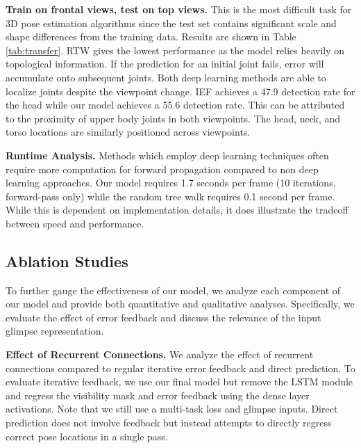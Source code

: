 \documentclass[runningheads]{llncs}
\begin{document}
	\textbf{Train on frontal views, test on top views.} This is the most difficult task for 3D pose estimation algorithms since the test set contains significant scale and shape differences from the training data. Results are shown in Table \ref{tab:transfer}. RTW gives the lowest performance as the model relies heavily on topological information.
	If the prediction for an initial joint fails, error will accumulate onto subsequent joints.
	Both deep learning methods are able to localize joints despite the viewpoint change.
	IEF achieves a 47.9 detection rate for the head while our model achieves a 55.6 detection rate.
	This can be attributed to the proximity of upper body joints in both viewpoints. The head, neck, and torso locations are similarly positioned across viewpoints.

	\textbf{Runtime Analysis.} Methods which employ deep learning techniques often require more computation for forward propagation compared to non deep learning approaches. Our model requires 1.7 seconds per frame (10 iterations, forward-pass only) while the random tree walk requires 0.1 second per frame. While this is dependent on implementation details, it does illustrate the tradeoff between speed and performance.

	\subsection{Ablation Studies}

	To further gauge the effectiveness of our model, we analyze each component of our model and provide both quantitative and qualitative analyses. Specifically, we evaluate the effect of error feedback and discuss the relevance of the input glimpse representation.

	\textbf{Effect of Recurrent Connections.}
	We analyze the effect of recurrent connections compared to regular iterative error feedback and direct prediction. To evaluate iterative feedback, we use our final model but remove the LSTM module and regress the visibility mask  and error feedback  using the dense layer activations. Note that we still use a multi-task loss and glimpse inputs. Direct prediction does not involve feedback but instead attempts to directly regress correct pose locations in a single pass.
\end{document}
